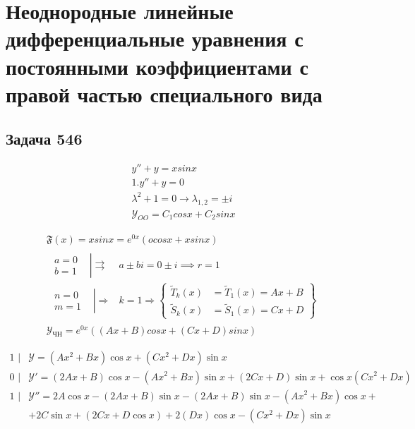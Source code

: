 \chapter{Неоднородные линейные дифференциальные уравнения с постоянными коэффициентами с правой частью специального вида}
\section{Задача 546}


\begin{gather}
    y''+y=xsinx\\
    1. y''+y=0\\
    \lambda ^2+1=0\longrightarrow \lambda_{1,2}=\pm i\\
    \boxed{\mathcal{Y}_{OO}=C_1cosx+C_2sinx}
\end{gather}

\begin{gather}
\mathfrak{F}(x) =xsinx=e^{0x}(ocosx+xsinx)  \\
    \begin{aligned}
        \left. \begin{aligned}
            a=0& \\
            b=1&
        \end{aligned} \right|
        \rightrightarrows &a\pm bi=0\pm i\implies r=1 \\
        \left. \begin{aligned}
          n=0& \\
          m=1&
        \end{aligned} \right|
          \Rightarrow &k=1\Longrightarrow 
            \left\{
                \begin{aligned}
                    \tilde{T}_k(x)&= \tilde{T}_1(x)=Ax+B \\
                    \tilde{S}_k(x)&=\tilde{S}_1(x)=Cx+D
                \end{aligned}
            \right\}
    \end{aligned}\\
\boxed{\mathcal{Y}_{\text{ЧН}}=e^{0x}((Ax+B)cosx+(Cx+D)sinx)}
\end{gather}

\begin{align*}
    \text{1 } | &\mathcal{Y}=(Ax^2+Bx)\cos x+(Cx^2+Dx)\sin x \\
    \text{0 } | &\mathcal{Y}'=(2Ax+B)\cos x-(Ax^2+Bx)\sin x+(2Cx+D)\sin x 
            +\cos x(Cx^2+Dx) \\
    \text{1 } | &\mathcal{Y}''=2A\cos x-(2Ax+B)\sin x-(2Ax+B)\sin x-(Ax^2+Bx)\cos x+ \\
     &+2C \sin x+(2Cx+D\cos x)+2(Dx)\cos x-(Cx^2+Dx)\sin x
\end{align*}

